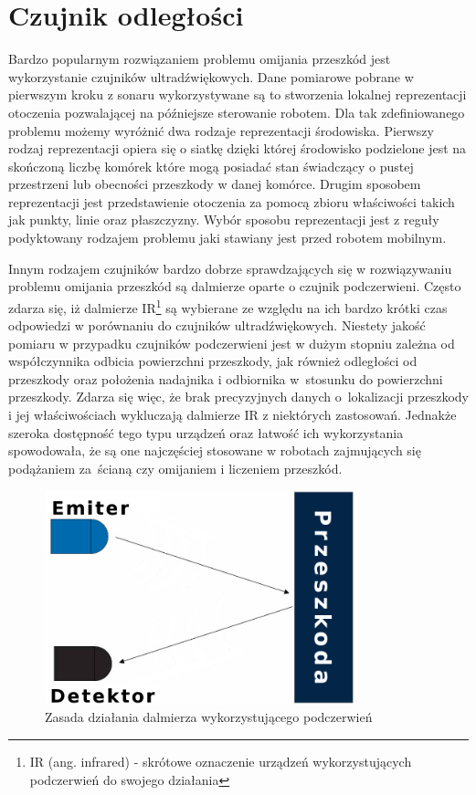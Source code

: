 \section{Czujnik odległości}
Bardzo popularnym rozwiązaniem problemu omijania przeszkód jest wykorzystanie
czujników ultradźwiękowych. Dane pomiarowe pobrane w pierwszym kroku z sonaru
wykorzystywane są to stworzenia lokalnej reprezentacji otoczenia pozwalającej na
późniejsze sterowanie robotem\cite{ObstaclesAvoidanceIR}. Dla tak zdefiniowanego
problemu możemy wyróżnić dwa rodzaje reprezentacji środowiska. Pierwszy rodzaj
reprezentacji opiera się o siatkę dzięki której środowisko podzielone jest na
skończoną liczbę komórek które mogą posiadać stan świadczący o pustej przestrzeni
lub obecności przeszkody w danej komórce. Drugim sposobem reprezentacji jest
przedstawienie otoczenia za pomocą zbioru właściwości takich jak punkty, linie
oraz płaszczyzny. Wybór sposobu reprezentacji jest z reguły podyktowany
rodzajem problemu jaki stawiany jest przed robotem mobilnym.

Innym rodzajem czujników bardzo dobrze sprawdzających się w rozwiązywaniu
problemu omijania przeszkód są dalmierze oparte o czujnik podczerwieni. Często
zdarza się, iż dalmierze IR\footnote{IR (ang. infrared) - skrótowe oznaczenie
urządzeń wykorzystujących podczerwień do swojego działania} są wybierane ze
względu na ich bardzo krótki czas odpowiedzi w porównaniu do czujników
ultradźwiękowych. Niestety jakość pomiaru w przypadku
czujników podczerwieni jest w dużym stopniu zależna od współczynnika odbicia
powierzchni przeszkody, jak również odległości od przeszkody oraz położenia
nadajnika i odbiornika w~stosunku do powierzchni przeszkody. Zdarza się więc, że
brak precyzyjnych danych o~lokalizacji przeszkody i jej właściwościach
wykluczają dalmierze IR z niektórych zastosowań. Jednakże szeroka dostępność
tego typu urządzeń oraz łatwość ich wykorzystania spowodowała, że są one
najczęściej stosowane w robotach zajmujących się podążaniem za~ścianą czy
omijaniem i liczeniem przeszkód.

\begin{figure}[h!]
 \centering
 \includegraphics[height=62mm]{../images/ch04/ir_sensor.png}
 \caption{Zasada działania dalmierza wykorzystującego podczerwień}
 \label{fig:IRSensors}
\end{figure}

